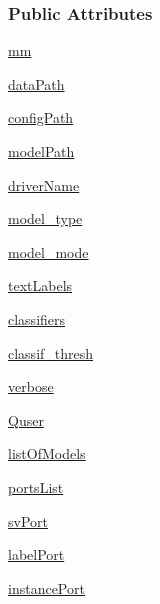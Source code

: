 \subsubsection*{Public Attributes}
\begin{DoxyCompactItemize}
\item 
\hyperlink{group__icubclient__SAM__Core_a65109034f0d2c8090362df40fb27fbd1}{mm}
\item 
\hyperlink{group__icubclient__SAM__Core_a4520ccea8e67c998b502152e88cb20ef}{data\+Path}
\item 
\hyperlink{group__icubclient__SAM__Core_a7c2ed96931ab6bfaed20e1c1ea783339}{config\+Path}
\item 
\hyperlink{group__icubclient__SAM__Core_adfc7f23a60039e250ac4acf8654c036a}{model\+Path}
\item 
\hyperlink{group__icubclient__SAM__Core_a5147b94d30ceb4567783dd15b8eb601e}{driver\+Name}
\item 
\hyperlink{group__icubclient__SAM__Core_aadd9265ed4721b61d0de917b143747c5}{model\+\_\+type}
\item 
\hyperlink{group__icubclient__SAM__Core_a53675bd6e61e6ec79f10fcac34a5f56c}{model\+\_\+mode}
\item 
\hyperlink{group__icubclient__SAM__Core_aec9dde986913e34601d23667c60ed3df}{text\+Labels}
\item 
\hyperlink{group__icubclient__SAM__Core_a7bf36af1faebe9664b7161308078e03b}{classifiers}
\item 
\hyperlink{group__icubclient__SAM__Core_a3aff97bed4196bbddc9fd5373e5b6572}{classif\+\_\+thresh}
\item 
\hyperlink{group__icubclient__SAM__Core_ae3d620854e90abd0e9e10c1163a33d03}{verbose}
\item 
\hyperlink{group__icubclient__SAM__Core_a04f456bd8d694107da65486d1434b932}{Quser}
\item 
\hyperlink{group__icubclient__SAM__Core_ae14efe16279475b432ce0b97acfdb854}{list\+Of\+Models}
\item 
\hyperlink{group__icubclient__SAM__Core_a9ef9e1183bf8a3e120740d24849ffb20}{ports\+List}
\item 
\hyperlink{group__icubclient__SAM__Core_afe76d176df27121b598fc982e8275f9d}{sv\+Port}
\item 
\hyperlink{group__icubclient__SAM__Core_ae931f97a9b31e2e49dd0bffdab977630}{label\+Port}
\item 
\hyperlink{group__icubclient__SAM__Core_a1c6238b7f4c373a3a4d7be972f24e218}{instance\+Port}
\item 

\end{DoxyCompactItemize}
